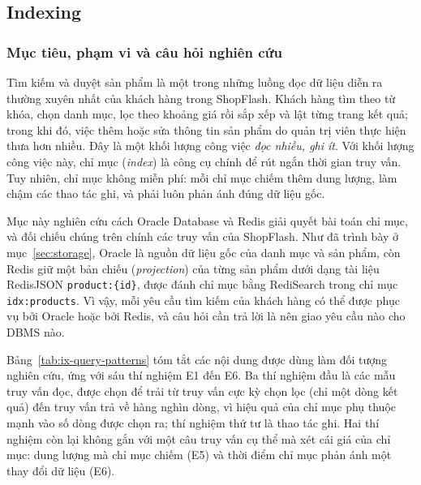 \subsection{Indexing}\label{sec:indexing}
\begingroup
\setcounter{table}{0}\setcounter{figure}{0}\setcounter{lstlisting}{0}
\renewcommand{\thetable}{\thesubsection.\arabic{table}}
\renewcommand{\thefigure}{\thesubsection.\arabic{figure}}
\renewcommand{\thelstlisting}{\thesubsection.\arabic{lstlisting}}
\renewcommand{\theHtable}{\thesubsection.\arabic{table}}
\renewcommand{\theHfigure}{\thesubsection.\arabic{figure}}
\def\theHlstlisting{\thesubsection.\arabic{lstlisting}}

\subsubsection{Mục tiêu, phạm vi và câu hỏi nghiên cứu}\label{sec:ix-goal}

Tìm kiếm và duyệt sản phẩm là một trong những luồng đọc dữ liệu diễn ra thường xuyên nhất của khách hàng trong ShopFlash. Khách hàng tìm theo từ khóa, chọn danh mục, lọc theo khoảng giá rồi sắp xếp và lật từng trang kết quả; trong khi đó, việc thêm hoặc sửa thông tin sản phẩm do quản trị viên thực hiện thưa hơn nhiều. Đây là một khối lượng công việc \emph{đọc nhiều, ghi ít}. Với khối lượng công việc này, chỉ mục (\emph{index}) là công cụ chính để rút ngắn thời gian truy vấn. Tuy nhiên, chỉ mục không miễn phí: mỗi chỉ mục chiếm thêm dung lượng, làm chậm các thao tác ghi, và phải luôn phản ánh đúng dữ liệu gốc.

Mục này nghiên cứu cách Oracle Database và Redis giải quyết bài toán chỉ mục, và đối chiếu chúng trên chính các truy vấn của ShopFlash. Như đã trình bày ở mục~\ref{sec:storage}, Oracle là nguồn dữ liệu gốc của danh mục và sản phẩm, còn Redis giữ một bản chiếu (\emph{projection}) của từng sản phẩm dưới dạng tài liệu RedisJSON \texttt{product:\{id\}}, được đánh chỉ mục bằng RediSearch trong chỉ mục \texttt{idx:products}. Vì vậy, mỗi yêu cầu tìm kiếm của khách hàng có thể được phục vụ bởi Oracle hoặc bởi Redis, và câu hỏi cần trả lời là nên giao yêu cầu nào cho DBMS nào.

Bảng~\ref{tab:ix-query-patterns} tóm tắt các nội dung được dùng làm đối tượng nghiên cứu, ứng với sáu thí nghiệm E1 đến E6. Ba thí nghiệm đầu là các mẫu truy vấn đọc, được chọn để trải từ truy vấn cực kỳ chọn lọc (chỉ một dòng kết quả) đến truy vấn trả về hàng nghìn dòng, vì hiệu quả của chỉ mục phụ thuộc mạnh vào số dòng được chọn ra; thí nghiệm thứ tư là thao tác ghi. Hai thí nghiệm còn lại không gắn với một câu truy vấn cụ thể mà xét cái giá của chỉ mục: dung lượng mà chỉ mục chiếm (E5) và thời điểm chỉ mục phản ánh một thay đổi dữ liệu (E6).

